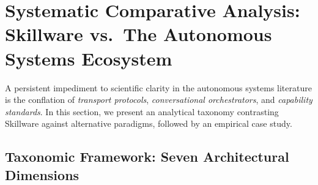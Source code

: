 
\section[Systematic Comparative Analysis: Skillware vs. The Autonomous Systems Ecosystem]{Systematic Comparative Analysis:\texorpdfstring{\\}{ }Skillware vs.~The Autonomous Systems Ecosystem}
\label{sec:comparative_analysis}

A persistent impediment to scientific clarity in the autonomous systems literature is the conflation of \emph{transport protocols}, \emph{conversational orchestrators}, and \emph{capability standards}. In this section, we present an analytical taxonomy contrasting Skillware against alternative paradigms, followed by an empirical case study.

\subsection{Taxonomic Framework: Seven Architectural Dimensions}
\label{subsec:ecosystem_taxonomy}

